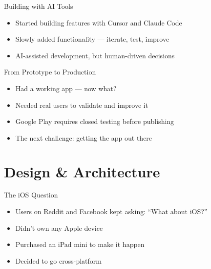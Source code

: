 \documentclass[aspectratio=169]{beamer}
\begin{document}
\begin{frame}{Building with AI Tools}
  \begin{itemize}
    \item Started building features with Cursor and Claude Code
    \item Slowly added functionality --- iterate, test, improve
    \item AI-assisted development, but human-driven decisions
  \end{itemize}
\end{frame}

\begin{frame}{From Prototype to Production}
  \begin{itemize}
    \item Had a working app --- now what?
    \item Needed real users to validate and improve it
    \item Google Play requires closed testing before publishing
    \item The next challenge: getting the app out there
  \end{itemize}
\end{frame}

\section{Design \& Architecture}

\begin{frame}{The iOS Question}
  \begin{itemize}
    \item Users on Reddit and Facebook kept asking: ``What about iOS?''
    \item Didn't own any Apple device
    \item Purchased an iPad mini to make it happen
    \item Decided to go cross-platform
  \end{itemize}
\end{frame}
\end{document}
